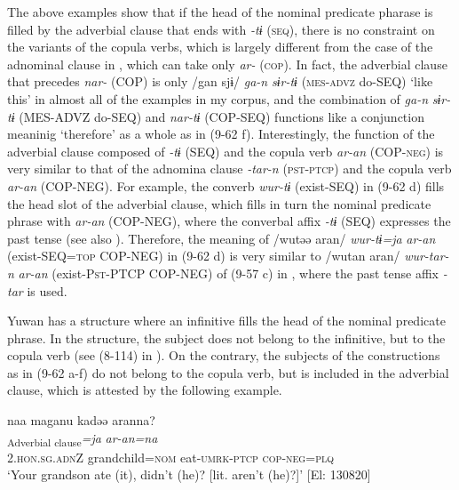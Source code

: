 The above examples show that if the head of the nominal predicate pharase is filled by the adverbial clause that ends with \textit{{}-tɨ} (\textsc{seq}), there is no constraint on the variants of the copula verbs, which is largely different from the case of the adnominal clause in , which can take only \textit{ar-} (\textsc{cop}). In fact, the adverbial clause that precedes \textit{nar-} (COP) is only /gan sjɨ/ \textit{ga-n} \textit{sɨr-tɨ} (\textsc{mes}-\textsc{advz} do-SEQ) ‘like this’ in almost all of the examples in my corpus, and the combination of \textit{ga-n} \textit{sɨr-tɨ} (MES-ADVZ do-SEQ) and \textit{nar-tɨ} (COP-SEQ) functions like a conjunction meaninig ‘therefore’ as a whole as in (9-62 f). Interestingly, the function of the adverbial clause composed of \textit{{}-tɨ} (SEQ) and the copula verb \textit{ar-an} (COP-\textsc{neg}) is very similar to that of the adnomina clause \textit{{}-tar-n} (\textsc{pst}-\textsc{ptcp}) and the copula verb \textit{ar-an} (COP-NEG). For example, the converb \textit{wur-tɨ} (exist-SEQ) in (9-62 d) fills the head slot of the adverbial clause, which fills in turn the nominal predicate phrase with \textit{ar-an} (COP-NEG), where the converbal affix \textit{{}-tɨ} (SEQ) expresses the past tense (see also ). Therefore, the meaning of /wutəə aran/ \textit{wur-tɨ=ja} \textit{ar-an} (exist-SEQ=\textsc{top} COP-NEG) in (9-62 d) is very similar to /wutan aran/ \textit{wur-tar-n} \textit{ar-an} (exist-P\textsc{st}-PTCP COP-NEG) of (9-57 c) in , where the past tense affix \textit{-tar} is used.

Yuwan has a structure where an infinitive fills the head of the nominal predicate phrase. In the structure, the subject does not belong to the infinitive, but to the copula verb (see (8-114) in ). On the contrary, the subjects of the constructions as in (9-62 a-f) do not belong to the copula verb, but is included in the adverbial clause, which is attested by the following example.

\ea  \label{ex:9.63}
 \glll  naa  maganu  kadəə  aranna?\\
    [\textit{naa}  \textit{maga=\Highlight{nu}}  \textit{kam-tɨ}]\textsubscript{Adverbial clause}\textit{=ja}  \textit{ar-an=na}\\
    2.\textsc{hon}.\textsc{sg}.\textsc{adn}Z  grandchild=\textsc{nom}  eat-\textsc{umrk}-\textsc{ptcp}  \textsc{cop}-\textsc{neg}=\textsc{plq}\\
    \glt     ‘Your grandson ate (it), didn’t (he)? [lit. aren’t (he)?]’ [El: 130820]
\z

